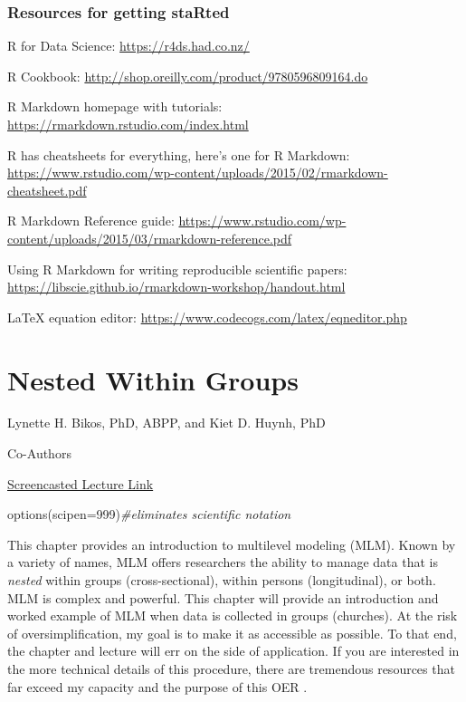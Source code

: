 \documentclass[
  english,
]{book}
\newenvironment{Shaded}{\begin{snugshade}}{\end{snugshade}}
\newcommand{\AttributeTok}[1]{\textcolor[rgb]{0.77,0.63,0.00}{#1}}
\newcommand{\CommentTok}[1]{\textcolor[rgb]{0.56,0.35,0.01}{\textit{#1}}}
\newcommand{\DecValTok}[1]{\textcolor[rgb]{0.00,0.00,0.81}{#1}}
\newcommand{\FunctionTok}[1]{\textcolor[rgb]{0.00,0.00,0.00}{#1}}
\newcommand{\NormalTok}[1]{#1}
\begin{document}
\hypertarget{resources-for-getting-started}{%
\subsection{Resources for getting staRted}\label{resources-for-getting-started}}

R for Data Science: \url{https://r4ds.had.co.nz/}

R Cookbook: \url{http://shop.oreilly.com/product/9780596809164.do}

R Markdown homepage with tutorials: \url{https://rmarkdown.rstudio.com/index.html}

R has cheatsheets for everything, here's one for R Markdown: \url{https://www.rstudio.com/wp-content/uploads/2015/02/rmarkdown-cheatsheet.pdf}

R Markdown Reference guide: \url{https://www.rstudio.com/wp-content/uploads/2015/03/rmarkdown-reference.pdf}

Using R Markdown for writing reproducible scientific papers: \url{https://libscie.github.io/rmarkdown-workshop/handout.html}

LaTeX equation editor: \url{https://www.codecogs.com/latex/eqneditor.php}

\hypertarget{wGroups}{%
\chapter{Nested Within Groups}\label{wGroups}}

Lynette H. Bikos, PhD, ABPP, and Kiet D. Huynh, PhD

Co-Authors

\href{https://spu.hosted.panopto.com/Panopto/Pages/Viewer.aspx?pid=f24e4b50-1204-4412-a78f-ad2500198bb6}{Screencasted Lecture Link}

\begin{Shaded}
\begin{Highlighting}[]
\FunctionTok{options}\NormalTok{(}\AttributeTok{scipen=}\DecValTok{999}\NormalTok{)}\CommentTok{\#eliminates scientific notation}
\end{Highlighting}
\end{Shaded}

This chapter provides an introduction to multilevel modeling (MLM). Known by a variety of names, MLM offers researchers the ability to manage data that is \emph{nested} within groups (cross-sectional), within persons (longitudinal), or both. MLM is complex and powerful. This chapter will provide an introduction and worked example of MLM when data is collected in groups (churches). At the risk of oversimplification, my goal is to make it as accessible as possible. To that end, the chapter and lecture will err on the side of application. If you are interested in the more technical details of this procedure, there are tremendous resources that far exceed my capacity and the purpose of this OER \citep[e.g.,][]{bryk_hierarchical_1992}.
\end{document}
